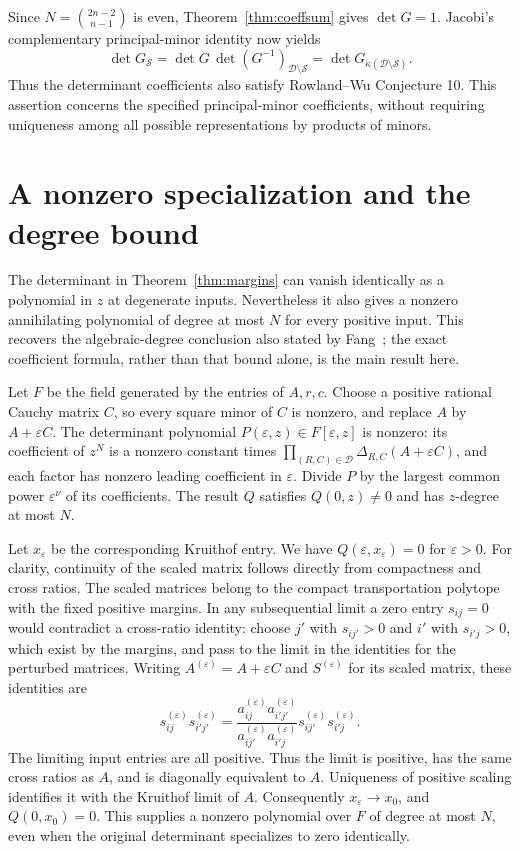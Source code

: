 \documentclass[11pt]{article}
\newcommand{\D}{\mathcal D}
\begin{document}
Since $N=\binom{2n-2}{n-1}$ is even, Theorem~\ref{thm:coeffsum} gives $\det G=1$. Jacobi's complementary principal-minor identity now yields
\[
 \det G_{\mathcal S}
 =\det G\,\det(G^{-1})_{\D\setminus\mathcal S}
 =\det G_{\kappa(\D\setminus\mathcal S)}.
\]
Thus the determinant coefficients also satisfy Rowland--Wu Conjecture 10. This assertion concerns the specified principal-minor coefficients, without requiring uniqueness among all possible representations by products of minors.

\section{A nonzero specialization and the degree bound}
The determinant in Theorem~\ref{thm:margins} can vanish identically as a polynomial in $z$ at degenerate inputs. Nevertheless it also gives a nonzero annihilating polynomial of degree at most $N$ for every positive input. This recovers the algebraic-degree conclusion also stated by Fang~\cite{fang}; the exact coefficient formula, rather than that bound alone, is the main result here.

Let $F$ be the field generated by the entries of $A,r,c$. Choose a positive rational Cauchy matrix $C$, so every square minor of $C$ is nonzero, and replace $A$ by $A+\varepsilon C$. The determinant polynomial $P(\varepsilon,z)\in F[\varepsilon,z]$ is nonzero: its coefficient of $z^N$ is a nonzero constant times $\prod_{(R,C)\in\D}\Delta_{R,C}(A+\varepsilon C)$, and each factor has nonzero leading coefficient in $\varepsilon$. Divide $P$ by the largest common power $\varepsilon^\nu$ of its coefficients. The result $Q$ satisfies $Q(0,z)\ne0$ and has $z$-degree at most $N$.

Let $x_\varepsilon$ be the corresponding Kruithof entry. We have $Q(\varepsilon,x_\varepsilon)=0$ for $\varepsilon>0$. For clarity, continuity of the scaled matrix follows directly from compactness and cross ratios. The scaled matrices belong to the compact transportation polytope with the fixed positive margins. In any subsequential limit a zero entry $s_{ij}=0$ would contradict a cross-ratio identity: choose $j'$ with $s_{ij'}>0$ and $i'$ with $s_{i'j}>0$, which exist by the margins, and pass to the limit in the identities for the perturbed matrices. Writing $A^{(\varepsilon)}=A+\varepsilon C$ and $S^{(\varepsilon)}$ for its scaled matrix, these identities are
\[
 s^{(\varepsilon)}_{ij}s^{(\varepsilon)}_{i'j'}=
 \frac{a^{(\varepsilon)}_{ij}a^{(\varepsilon)}_{i'j'}}{a^{(\varepsilon)}_{ij'}a^{(\varepsilon)}_{i'j}}s^{(\varepsilon)}_{ij'}s^{(\varepsilon)}_{i'j}.
\]
The limiting input entries are all positive. Thus the limit is positive, has the same cross ratios as $A$, and is diagonally equivalent to $A$. Uniqueness of positive scaling identifies it with the Kruithof limit of $A$. Consequently $x_\varepsilon\to x_0$, and $Q(0,x_0)=0$. This supplies a nonzero polynomial over $F$ of degree at most $N$, even when the original determinant specializes to zero identically.
\end{document}
